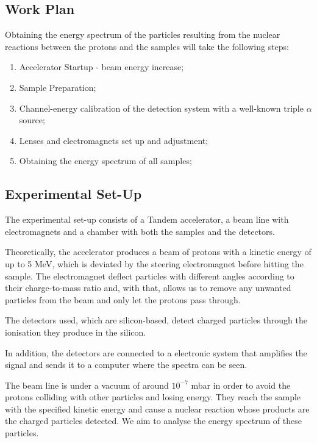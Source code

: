 \documentclass{article}
\begin{document}
\begin{multicols}{2}
\subsection{Work Plan}
    \label{sec:workplan}

Obtaining the energy spectrum of the particles resulting from the nuclear reactions between the protons and the samples will take the following steps:

\begin{enumerate}
  \item Accelerator Startup - beam energy increase;
  \item Sample Preparation;
  \item Channel-energy calibration of the detection system with a well-known triple $\alpha$ source;
  \item Lenses and electromagnets set up and adjustment;
  \item Obtaining the energy spectrum of all samples;
\end{enumerate}

\subsection{Experimental Set-Up}
    \label{sec:setup}

The experimental set-up consists of a Tandem accelerator, a beam line with electromagnets and a chamber with both the samples and the detectors. 

Theoretically, the accelerator produces a beam of protons with a kinetic energy of up to 5 MeV, which is deviated by the steering electromagnet before hitting the sample. The electromagnet deflect particles with different angles according to their charge-to-mass ratio and, with that, allows us to remove any unwanted particles from the beam and only let the protons pass through. 

The detectors used, which are silicon-based, detect charged particles through the ionisation they produce in the silicon.

In addition, the detectors are connected to a electronic system that amplifies the signal and sends it to a computer where the spectra can be seen.

The beam line is under a vacuum of around $10^{-7}$ mbar in order to avoid the protons colliding with other particles and losing energy. They reach the sample with the specified kinetic energy and cause a nuclear reaction whose products are the charged particles detected. We aim to analyse the energy spectrum of these particles.


\end{multicols}
\end{document}

